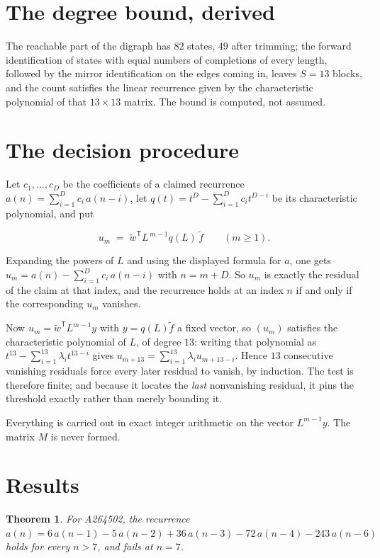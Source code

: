\documentclass[11pt]{article}
\newtheorem{theorem}{Theorem}
\theoremstyle{definition}
\begin{document}
\section{The degree bound, derived}

The reachable part of the digraph has $82$ states, $49$ after trimming; the forward identification of states with equal numbers of completions of every length, followed by the mirror identification on the edges coming in, leaves $S = 13$ blocks, and the count satisfies the linear recurrence given by the characteristic polynomial of that $13\times13$ matrix. The bound is computed, not assumed.

\section{The decision procedure}

Let $c_1,\dots,c_D$ be the coefficients of a claimed recurrence $a(n) = \sum_{i=1}^{D} c_i\,a(n-i)$, let $q(t) = t^{D} - \sum_{i=1}^{D} c_i t^{D-i}$ be its characteristic polynomial, and put

\[u_m \;=\; \tilde w^{\mathsf T} L^{\,m-1} q(L)\,\tilde f \qquad (m \ge 1).\]

Expanding the powers of $L$ and using the displayed formula for $a$, one gets $u_m = a(n) - \sum_{i=1}^{D} c_i\,a(n-i)$ with $n = m + D$. So $u_m$ is exactly the residual of the claim at that index, and the recurrence holds at an index $n$ if and only if the corresponding $u_m$ vanishes.

Now $u_m = \tilde w^{\mathsf T} L^{m-1} y$ with $y = q(L)\tilde f$ a fixed vector, so $(u_m)$ satisfies the characteristic polynomial of $L$, of degree $13$: writing that polynomial as $t^{13} - \sum_{i=1}^{13} \lambda_i t^{13-i}$ gives $u_{m+13} = \sum_{i=1}^{13} \lambda_i u_{m+13-i}$. Hence $13$ consecutive vanishing residuals force every later residual to vanish, by induction. The test is therefore finite; and because it locates the {\itshape last} nonvanishing residual, it pins the threshold exactly rather than merely bounding it.

Everything is carried out in exact integer arithmetic on the vector $L^{m-1}y$. The matrix $M$ is never formed.

\section{Results}

\begin{theorem} For A264502, the recurrence $a(n) = 6\,a(n-1) - 5\,a(n-2) + 36\,a(n-3) - 72\,a(n-4) - 243\,a(n-6)$ holds for every $n > 7$, and fails at $n = 7$.\end{theorem}
\end{document}
